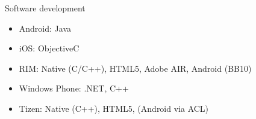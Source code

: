 \documentclass[presentation,aspectratio=43,12pt]{beamer}
\begin{document}
\begin{frame}[label=sec-4-4]{Software development}
\begin{itemize}
\item Android: Java
\item iOS: ObjectiveC
\item RIM: Native (C/C++), HTML5, Adobe AIR, Android (BB10)
\item Windows Phone: .NET, C++
\item Tizen: Native (C++), HTML5, (Android via ACL)
\end{itemize}
\end{frame}
\end{document}
